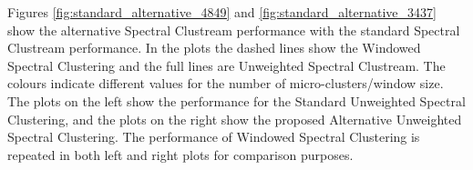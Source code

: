 Figures \ref{fig:standard_alternative_4849} and \ref{fig:standard_alternative_3437} show the alternative Spectral Clustream performance with the standard Spectral Clustream performance.   In the plots the dashed lines show the Windowed Spectral Clustering and the full lines are Unweighted Spectral Clustream. The colours indicate different values for the number of micro-clusters/window size. The plots on the left show the performance for the Standard Unweighted Spectral Clustering, and the plots on the right show the proposed Alternative Unweighted Spectral Clustering. The performance of Windowed Spectral Clustering is repeated in both left and right plots for comparison purposes. 



